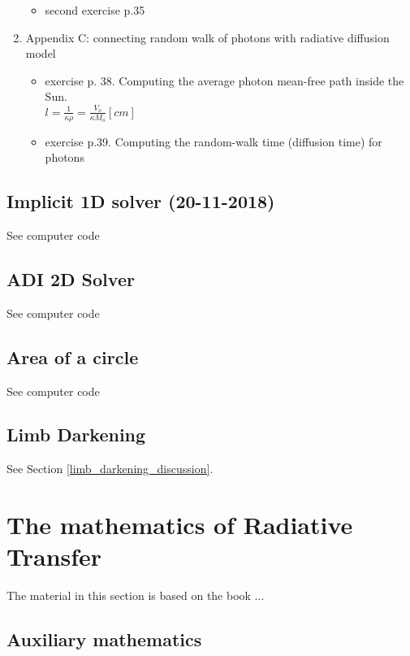 \documentclass[../main/main.tex]{subfiles}
\begin{document}
\begin{enumerate}
\begin{itemize}
\begin{itemize}
\end{itemize}

\item second exercise p.35
\end{itemize}

\item Appendix C: connecting random walk of photons with radiative diffusion model
\begin{itemize}
\item exercise p. 38. Computing the average photon mean-free path inside the Sun. \\
$l = \frac{1}{\kappa \rho} = \frac{V_o}{\kappa M_o} [cm]$

\item exercise p.39. Computing the random-walk time (diffusion time) for photons

\end{itemize}


\end{enumerate}

\subsection{Implicit 1D solver (20-11-2018)}
See computer code
\subsection{ADI 2D Solver}
See computer code
\subsection{Area of a circle}
See computer code
\subsection{Limb Darkening}
See Section \ref{limb_darkening_discussion}.


\newpage
\section{The mathematics of Radiative Transfer}
The material in this section is based on the book ...

\subsection{Auxiliary mathematics}
\end{document}

